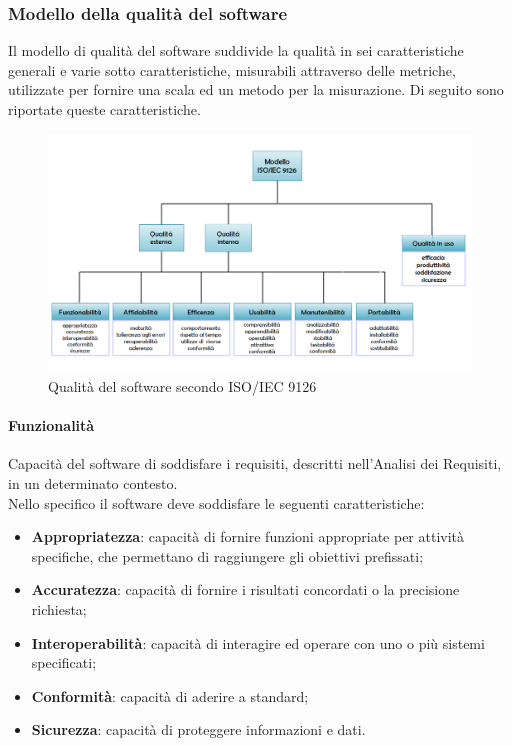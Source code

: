 		\subsubsection{Modello della qualità del software}
		Il modello di qualità del software suddivide la qualità in sei caratteristiche generali e varie sotto caratteristiche, misurabili attraverso delle metriche, utilizzate per fornire una scala ed un metodo per la misurazione. Di seguito sono riportate queste caratteristiche.
		\begin{figure}[H]
			\centering
			\includegraphics[scale=0.4]{res/images/iso9126.png}
			\caption{Qualità del software secondo ISO/IEC 9126}
		\end{figure}		
	
		\paragraph{Funzionalità}
		Capacità del software di soddisfare i requisiti, descritti nell'Analisi dei Requisiti, in un determinato contesto.\\
		Nello specifico il software deve soddisfare le seguenti caratteristiche:
		\begin{itemize}
			\item \textbf{Appropriatezza}: capacità di fornire funzioni appropriate per attività specifiche, che permettano di raggiungere gli obiettivi prefissati;
			\item \textbf{Accuratezza}: capacità di fornire i risultati concordati o la precisione richiesta;
			\item \textbf{Interoperabilità}: capacità di interagire ed operare con uno o più sistemi specificati;
			\item \textbf{Conformità}: capacità di aderire a standard;
			\item \textbf{Sicurezza}: capacità di proteggere informazioni e dati.
		\end{itemize}
